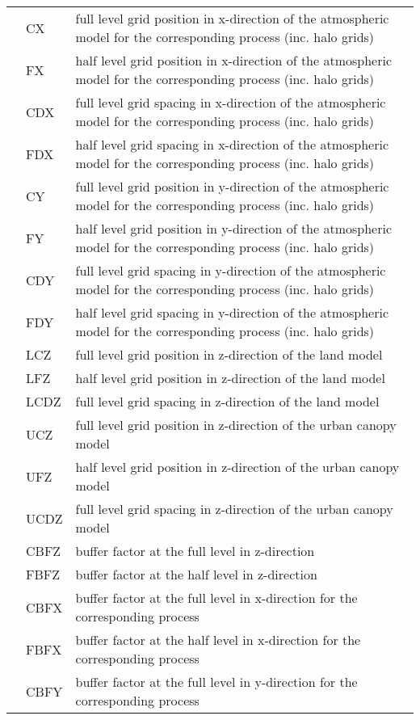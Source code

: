 \begin{longtable}{|l|ll|}
    & CX & full level grid position in x-direction of the atmospheric model for the corresponding process (inc. halo grids) \\
    & FX & half level grid position in x-direction of the atmospheric model for the corresponding process (inc. halo grids) \\
    & CDX & full level grid spacing in x-direction of the atmospheric model for the corresponding process (inc. halo grids) \\
    & FDX & half level grid spacing in x-direction of the atmospheric model for the corresponding process (inc. halo grids) \\
    & CY & full level grid position in y-direction of the atmospheric model for the corresponding process (inc. halo grids) \\
    & FY & half level grid position in y-direction of the atmospheric model for the corresponding process (inc. halo grids) \\
    & CDY & full level grid spacing in y-direction of the atmospheric model for the corresponding process (inc. halo grids) \\
    & FDY & half level grid spacing in y-direction of the atmospheric model for the corresponding process (inc. halo grids) \\
    & LCZ & full level grid position in z-direction of the land model \\
    & LFZ & half level grid position in z-direction of the land model \\
    & LCDZ & full level grid spacing in z-direction of the land model \\
    & UCZ & full level grid position in z-direction of the urban canopy model \\
    & UFZ & half level grid position in z-direction of the urban canopy model \\
    & UCDZ & full level grid spacing in z-direction of the urban canopy model \\
    & CBFZ & buffer factor at the full level in z-direction \\
    & FBFZ & buffer factor at the half level in z-direction \\
    & CBFX & buffer factor at the full level in x-direction for the corresponding process \\
    & FBFX & buffer factor at the half level in x-direction for the corresponding process \\
    & CBFY & buffer factor at the full level in y-direction for the corresponding process \\

\end{longtable}
